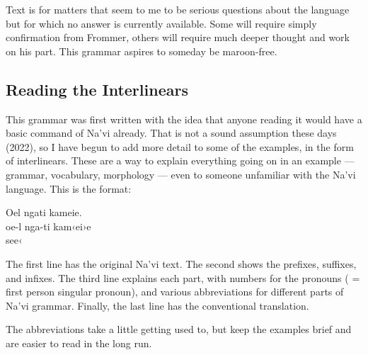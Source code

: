 Text  is for matters that seem to me to be serious
questions about the language but for which no answer is currently
available.  Some will require simply confirmation from Frommer, others
will require much deeper thought and work on his part.  This grammar
aspires to someday be maroon-free.


\subsection{Reading the Interlinears}
This grammar was first written with the idea that anyone reading it
would have a basic command of Na'vi already.  That is not a sound
assumption these days (2022), so I have begun to add more detail to
some of the examples, in the form of interlinears.  These are a way to
explain everything going on in an example — grammar, vocabulary,
morphology — even to someone unfamiliar with the Na'vi language.  This
is the format:

\begin{interlin}
 \glll Oel ngati kameie. \\
     oe-l nga-ti kam‹ei›e \\
       see‹ \\
\end{interlin}

\noindent The first line has the original Na'vi text.  The second
shows the prefixes, suffixes, and infixes.  The third line explains
each part, with numbers for the pronouns ( = first person
singular pronoun), and various abbreviations for different parts of
Na'vi grammar.  Finally, the last line has the conventional
translation. 

The abbreviations take a little getting used to, but keep the examples
brief and are easier to read in the long run.

